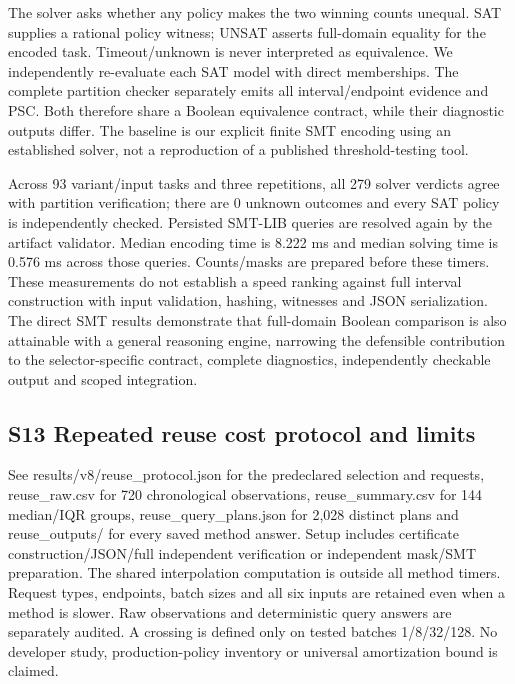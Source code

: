 \documentclass[11pt,a4paper]{article}
\theoremstyle{plain}
\theoremstyle{definition}
\theoremstyle{remark}
\begin{document}
The solver asks whether any policy makes the two winning counts unequal. SAT supplies a rational policy witness; UNSAT asserts full-domain equality for the encoded task. Timeout/unknown is never interpreted as equivalence. We independently re-evaluate each SAT model with direct memberships. The complete partition checker separately emits all interval/endpoint evidence and PSC. Both therefore share a Boolean equivalence contract, while their diagnostic outputs differ. The baseline is our explicit finite SMT encoding using an established solver, not a reproduction of a published threshold-testing tool.

Across 93 variant/input tasks and three repetitions, all 279 solver verdicts agree with partition verification; there are 0 unknown outcomes and every SAT policy is independently checked. Persisted SMT-LIB queries are resolved again by the artifact validator. Median encoding time is 8.222 ms and median solving time is 0.576 ms across those queries. Counts/masks are prepared before these timers. These measurements do not establish a speed ranking against full interval construction with input validation, hashing, witnesses and JSON serialization. The direct SMT results demonstrate that full-domain Boolean comparison is also attainable with a general reasoning engine, narrowing the defensible contribution to the selector-specific contract, complete diagnostics, independently checkable output and scoped integration.


\subsection*{S13 Repeated reuse cost protocol and limits}\label{sec:s13}

See results/v8/reuse\_protocol.json for the predeclared selection and requests, reuse\_raw.csv for 720 chronological observations, reuse\_summary.csv for 144 median/IQR groups, reuse\_query\_plans.json for 2,028 distinct plans and reuse\_outputs/ for every saved method answer. Setup includes certificate construction/JSON/full independent verification or independent mask/SMT preparation. The shared interpolation computation is outside all method timers. Request types, endpoints, batch sizes and all six inputs are retained even when a method is slower. Raw observations and deterministic query answers are separately audited. A crossing is defined only on tested batches 1/8/32/128. No developer study, production-policy inventory or universal amortization bound is claimed.
\end{document}
